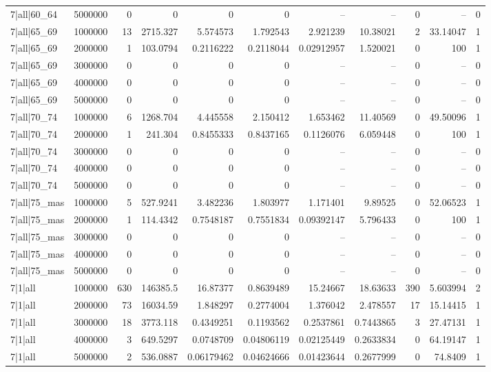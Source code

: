 \begin{tabular}{lrrrrrrrrrr}
7|all|60\_64 & 5000000 & 0 & 0 & 0 & 0 & -- & -- & 0 & -- & 0 \\
7|all|65\_69 & 1000000 & 13 & 2715.327 & 5.574573 & 1.792543 & 2.921239 & 10.38021 & 2 & 33.14047 & 1 \\
7|all|65\_69 & 2000000 & 1 & 103.0794 & 0.2116222 & 0.2118044 & 0.02912957 & 1.520021 & 0 & 100 & 1 \\
7|all|65\_69 & 3000000 & 0 & 0 & 0 & 0 & -- & -- & 0 & -- & 0 \\
7|all|65\_69 & 4000000 & 0 & 0 & 0 & 0 & -- & -- & 0 & -- & 0 \\
7|all|65\_69 & 5000000 & 0 & 0 & 0 & 0 & -- & -- & 0 & -- & 0 \\
7|all|70\_74 & 1000000 & 6 & 1268.704 & 4.445558 & 2.150412 & 1.653462 & 11.40569 & 0 & 49.50096 & 1 \\
7|all|70\_74 & 2000000 & 1 & 241.304 & 0.8455333 & 0.8437165 & 0.1126076 & 6.059448 & 0 & 100 & 1 \\
7|all|70\_74 & 3000000 & 0 & 0 & 0 & 0 & -- & -- & 0 & -- & 0 \\
7|all|70\_74 & 4000000 & 0 & 0 & 0 & 0 & -- & -- & 0 & -- & 0 \\
7|all|70\_74 & 5000000 & 0 & 0 & 0 & 0 & -- & -- & 0 & -- & 0 \\
7|all|75\_mas & 1000000 & 5 & 527.9241 & 3.482236 & 1.803977 & 1.171401 & 9.89525 & 0 & 52.06523 & 1 \\
7|all|75\_mas & 2000000 & 1 & 114.4342 & 0.7548187 & 0.7551834 & 0.09392147 & 5.796433 & 0 & 100 & 1 \\
7|all|75\_mas & 3000000 & 0 & 0 & 0 & 0 & -- & -- & 0 & -- & 0 \\
7|all|75\_mas & 4000000 & 0 & 0 & 0 & 0 & -- & -- & 0 & -- & 0 \\
7|all|75\_mas & 5000000 & 0 & 0 & 0 & 0 & -- & -- & 0 & -- & 0 \\
7|1|all & 1000000 & 630 & 146385.5 & 16.87377 & 0.8639489 & 15.24667 & 18.63633 & 390 & 5.603994 & 2 \\
7|1|all & 2000000 & 73 & 16034.59 & 1.848297 & 0.2774004 & 1.376042 & 2.478557 & 17 & 15.14415 & 1 \\
7|1|all & 3000000 & 18 & 3773.118 & 0.4349251 & 0.1193562 & 0.2537861 & 0.7443865 & 3 & 27.47131 & 1 \\
7|1|all & 4000000 & 3 & 649.5297 & 0.0748709 & 0.04806119 & 0.02125449 & 0.2633834 & 0 & 64.19147 & 1 \\
7|1|all & 5000000 & 2 & 536.0887 & 0.06179462 & 0.04624666 & 0.01423644 & 0.2677999 & 0 & 74.8409 & 1 \\

\end{tabular}
